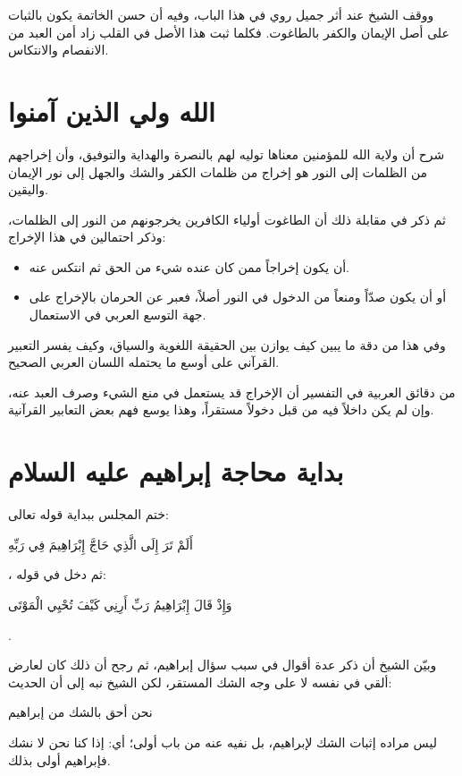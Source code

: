 ووقف الشيخ عند أثر جميل روي في هذا الباب، وفيه أن حسن الخاتمة يكون بالثبات على أصل الإيمان والكفر بالطاغوت. فكلما ثبت هذا الأصل في القلب زاد أمن العبد من الانفصام والانتكاس.

\section{الله ولي الذين آمنوا}
شرح  أن ولاية الله للمؤمنين معناها توليه لهم بالنصرة والهداية والتوفيق، وأن إخراجهم من الظلمات إلى النور هو إخراج من ظلمات الكفر والشك والجهل إلى نور الإيمان واليقين.

ثم ذكر في مقابلة ذلك أن الطاغوت أولياء الكافرين يخرجونهم من النور إلى الظلمات، وذكر احتمالين في هذا الإخراج:
\begin{itemize}
    \item أن يكون إخراجاً ممن كان عنده شيء من الحق ثم انتكس عنه.
    \item أو أن يكون صدّاً ومنعاً من الدخول في النور أصلاً، فعبر عن الحرمان بالإخراج على جهة التوسع العربي في الاستعمال.
\end{itemize}

وفي هذا من دقة  ما يبين كيف يوازن بين الحقيقة اللغوية والسياق، وكيف يفسر التعبير القرآني على أوسع ما يحتمله اللسان العربي الصحيح.

\begin{fawaid}
من دقائق العربية في التفسير أن الإخراج قد يستعمل في منع الشيء وصرف العبد عنه، وإن لم يكن داخلاً فيه من قبل دخولاً مستقراً، وهذا يوسع فهم بعض التعابير القرآنية.
\end{fawaid}

\separator

\section{بداية محاجة إبراهيم عليه السلام}
ختم المجلس ببداية قوله تعالى: \begin{ayah}أَلَمْ تَرَ إِلَى الَّذِي حَاجَّ إِبْرَاهِيمَ فِي رَبِّهِ\end{ayah}، ثم دخل في قوله: \begin{ayah}وَإِذْ قَالَ إِبْرَاهِيمُ رَبِّ أَرِنِي كَيْفَ تُحْيِي الْمَوْتَى\end{ayah}.

وبيّن الشيخ أن  ذكر عدة أقوال في سبب سؤال إبراهيم، ثم رجح أن ذلك كان لعارض ألقي في نفسه لا على وجه الشك المستقر، لكن الشيخ نبه إلى أن الحديث: \begin{hadith}نحن أحق بالشك من إبراهيم\end{hadith} ليس مراده إثبات الشك لإبراهيم، بل نفيه عنه من باب أولى؛ أي: إذا كنا نحن لا نشك فإبراهيم أولى بذلك.

